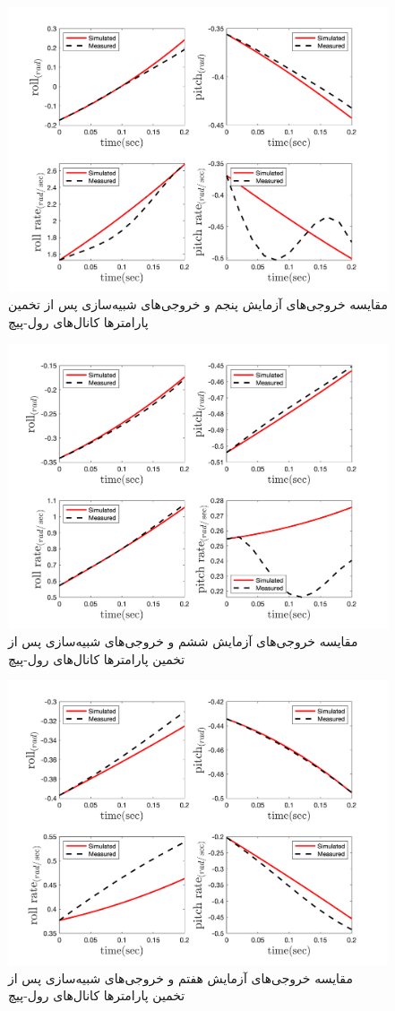 \begin{figure}[H]
	\includegraphics[width=12cm]{../../Figures/RCP/roll_pitch_parameter_estimation/RCP_roll_pitch_S5.png}
	\centering
	\caption{مقايسه خروجی‌های آزمايش پنجم و خروجی‌های شبیه‌سازی پس از تخمین پارامترها کانال‌های رول-پیچ}
	\label{roll_pitch_ps5}
\end{figure}
\begin{figure}[H]
	\includegraphics[width=12cm]{../../Figures/RCP/roll_pitch_parameter_estimation/RCP_roll_pitch_S6.png}
	\centering
	\caption{مقايسه خروجی‌های آزمايش ششم و خروجی‌های شبیه‌سازی پس از تخمین پارامترها کانال‌های رول-پیچ}
	\label{roll_pitch_ps6}
\end{figure}
\begin{figure}[H]
	\includegraphics[width=12cm]{../../Figures/RCP/roll_pitch_parameter_estimation/RCP_roll_pitch_S7.png}
	\centering
	\caption{مقايسه خروجی‌های آزمايش هفتم و خروجی‌های شبیه‌سازی پس از تخمین پارامترها کانال‌های رول-پیچ}
	\label{roll_pitch_ps7}
\end{figure}